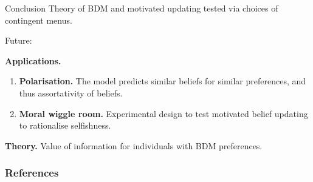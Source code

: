 \documentclass[usenames,dvipsnames,aspectratio=169,11pt, envcountsect]{beamer}
\begin{document}
\begin{comment}
	\begin{equation}
		\begin{aligned}
			\mathcal{U} \left(M ; \ell \left( M_{F} \right) \right) = & \max _{f \in M}\left\{\int_{M_F} u \left( f \left( s \right), \ell \left( M_{F} \right) \right) d p\left(\cdot \mid \ell \left(M_F \right) \right) \right.                \\
			                                                          & \left. +\alpha _{\ell_{M_F}} \int_{M_F} u \left( f \left(s \right) ,  \ell^{\prime}_{M_F} \right) d p\left(\cdot \mid \ell^{\prime}_{M_F} \right)\right\}                 \\
			                                                          & -\max _{f^{\prime} \in M} \alpha _{\ell_{M_F}} \int_{M_F} u\left(f^{\prime}\left(s \right) , \ell^{\prime}_{M_F} \right) d p\left(\cdot \mid \ell^{\prime}_{M_F}\right) .
		\end{aligned} \tag{2}
	\end{equation}

\end{frame}

\end{comment}

\begin{frame}{Conclusion}
	Theory of BDM and motivated updating tested via choices of contingent menus.

	\vfill

	Future:

	\vfill

	\begin{wideitemize}
		\item \textbf{Applications.}
		\vfill
		\begin{enumerate}
			\item \textbf{Polarisation.} The model predicts similar beliefs for similar preferences, and thus assortativity of beliefs.
			\item \textbf{Moral wiggle room.} Experimental design to test motivated belief updating to rationalise selfishness.
		\end{enumerate}
		\item \textbf{Theory.} Value of information for individuals with BDM preferences.
	\end{wideitemize}

\end{frame}

\begin{frame}

	\frametitle{References}

	
	


\end{frame}
\end{document}
